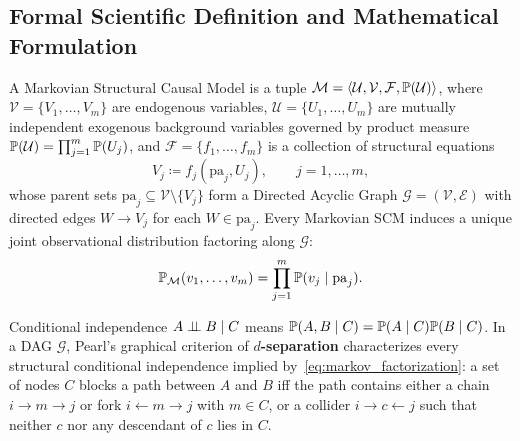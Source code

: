 \subsection{Formal Scientific Definition and Mathematical Formulation}
\begin{definition}
A Markovian Structural Causal Model is a tuple $\mathcal{M} = \langle \mathcal{U}, \mathcal{V}, \mathcal{F}, \mathbb{P}(\mathcal{U}) \rangle$, where $\mathcal{V} = \{V_1,\dots,V_m\}$ are endogenous variables, $\mathcal{U} = \{U_1,\dots,U_m\}$ are mutually independent exogenous background variables governed by product measure $\mathbb{P}(\mathcal{U}) = \prod_{j=1}^m \mathbb{P}(U_j)$, and $\mathcal{F} = \{f_1,\dots,f_m\}$ is a collection of structural equations
\begin{equation}
  V_j \coloneqq f_j(\mathrm{pa}_j, U_j), \qquad j = 1,\dots,m,
\end{equation}
whose parent sets $\mathrm{pa}_j \subseteq \mathcal{V}\setminus\{V_j\}$ form a Directed Acyclic Graph $\mathcal{G} = (\mathcal{V}, \mathcal{E})$ with directed edges $W \to V_j$ for each $W \in \mathrm{pa}_j$. Every Markovian SCM induces a unique joint observational distribution factoring along $\mathcal{G}$:
\begin{equation}
  \mathbb{P}_{\mathcal{M}}(v_1,\dots,v_m) = \prod_{j=1}^m \mathbb{P}(v_j \mid \mathrm{pa}_j).
  \label{eq:markov_factorization}
\end{equation}
\end{definition}

Conditional independence $A \perp\!\!\!\perp B \mid C$ means $\mathbb{P}(A,B\mid C) = \mathbb{P}(A\mid C)\mathbb{P}(B\mid C)$. In a DAG $\mathcal{G}$, Pearl's graphical criterion of \textbf{$d$-separation} characterizes every structural conditional independence implied by~\eqref{eq:markov_factorization}: a set of nodes $C$ blocks a path between $A$ and $B$ iff the path contains either a chain $i \to m \to j$ or fork $i \leftarrow m \to j$ with $m \in C$, or a collider $i \to c \leftarrow j$ such that neither $c$ nor any descendant of $c$ lies in $C$.

